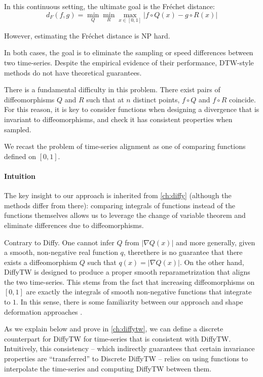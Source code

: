 In this continuous setting, the ultimate goal is the Fréchet distance:
\begin{equation}
d_{F}(f, g) = \min_{Q}\min_{R}\max_{x\in[0,1]}\vert f\circ Q(x) - g\circ R(x)\vert
\end{equation}

However, estimating the Fréchet distance is NP hard.

In both cases, the goal is to eliminate the sampling or speed differences between two time-series. Despite the empirical evidence of their performance, DTW-style methods do not have theoretical guarantees.

There is a fundamental difficulty in this problem. There exist pairs of diffeomorphisms $Q$ and $R$ such that at $n$ distinct points, $f\circ Q$ and $f \circ R$ coincide. For this reason, it is key to consider functions when designing a divergence that is invariant to diffeomorphisms, and check it has consistent properties when sampled.

We recast the problem of time-series alignment as one of comparing functions defined on $[0,1]$.

\paragraph{Intuition}
The key insight to our approach is inherited from \cref{ch:diffy} (although the methods differ from there): comparing integrals of functions instead of the functions themselves allows us to leverage the change of variable theorem and eliminate differences due to diffeomorphisms.

Contrary to Diffy.
One cannot infer $Q$ from $\vert \nabla Q(x)\vert$ and more generally, given a smooth, non-negative real function $q$, therethere is no guarantee that there exists a diffeomorphism $Q$ such that $q(x) = \vert \nabla Q(x) \vert$. On the other hand, DiffyTW is designed to produce a proper smooth reparametrization that aligns the two time-series. This stems from the fact that increasing diffeomorphisms on $[0,1]$ are exactly the integrals of smooth non-negative functions that integrate to $1$. In this sense, there is some familiarity between our approach and shape deformation approaches \cite{younes}.

As we explain below and prove in \cref{ch:diffytw}, we can define a discrete counterpart for DiffyTW for time-series that is consistent with DiffyTW. Intuitively, this consistency -- which indirectly guarantees that certain invariance properties are ``transferred'' to Discrete DiffyTW -- relies on using functions to interpolate the time-series and computing DiffyTW between them.

